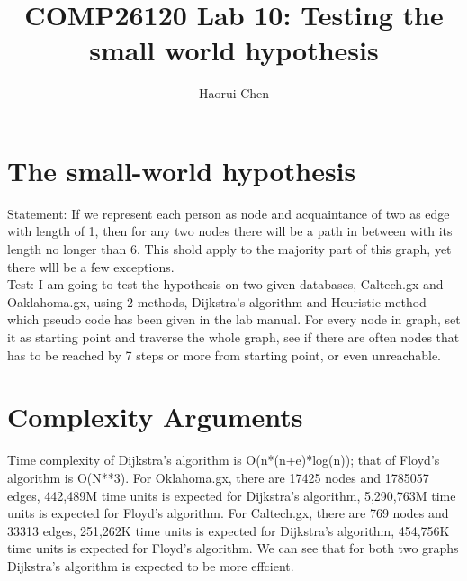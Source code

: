 \documentclass{article}
\title{COMP26120 Lab 10: Testing the small world hypothesis}
\author{Haorui Chen}
\begin{document}
\maketitle


\section{The small-world hypothesis}
\label{sec:small world}
Statement: If we represent each person as node and acquaintance of two as edge with length of 1, then for any two nodes there will be a path in between with its length no longer than 6. This shold apply to the majority part of this graph, yet there wlll be a few exceptions.\\
Test: I am going to test the hypothesis on two given databases, Caltech.gx and Oaklahoma.gx, using 2 methods, Dijkstra's algorithm and Heuristic method which pseudo code has been given in the lab manual. For every node in graph, set it as starting point and traverse the whole graph, see if there are often nodes that has to be reached by 7 steps or more from starting point, or even unreachable.

\section{Complexity Arguments}
\label{sec:complexity}
Time complexity of Dijkstra's algorithm is O(n*(n+e)*log(n)); that of Floyd's algorithm is O(N**3).
For Oklahoma.gx, there are 17425 nodes and 1785057 edges, 442,489M time units is expected for Dijkstra's algorithm, 5,290,763M time units is expected for Floyd's algorithm.
For Caltech.gx, there are 769 nodes and 33313 edges, 251,262K time units is expected for Dijkstra's algorithm, 454,756K time units is expected for Floyd's algorithm.
We can see that for both two graphs Dijkstra's algorithm is expected to be more effcient.
\end{document}
